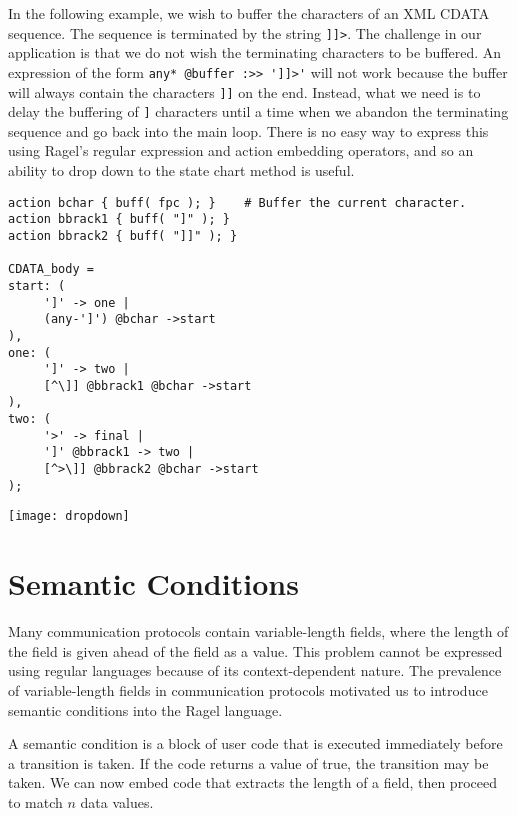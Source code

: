 \documentclass[letterpaper,11pt,oneside]{book}
\newcommand{\graphspace}{\vspace{10pt}}
\newenvironment{inline_code}{\def\baselinestretch{1}\vspace{12pt}\small}{}
\begin{document}
In the following example, we wish to buffer the characters of an XML CDATA
sequence. The sequence is terminated by the string \verb|]]>|. The challenge
in our application is that we do not wish the terminating characters to be
buffered. An expression of the form \verb|any* @buffer :>> ']]>'| will not work
because the buffer will always contain the characters \verb|]]| on the end.
Instead, what we need is to delay the buffering of \hspace{0.25mm} \verb|]|
characters until a time when we
abandon the terminating sequence and go back into the main loop. There is no
easy way to express this using Ragel's regular expression and action embedding
operators, and so an ability to drop down to the state chart method is useful.

\begin{inline_code}
\begin{verbatim}
action bchar { buff( fpc ); }    # Buffer the current character.
action bbrack1 { buff( "]" ); }
action bbrack2 { buff( "]]" ); }

CDATA_body =
start: (
     ']' -> one |
     (any-']') @bchar ->start
),
one: (
     ']' -> two |
     [^\]] @bbrack1 @bchar ->start
),
two: (
     '>' -> final |
     ']' @bbrack1 -> two |
     [^>\]] @bbrack2 @bchar ->start
);
\end{verbatim}
\end{inline_code}

\graphspace
\begin{center}
\texttt{[image: dropdown]}
\end{center}


\section{Semantic Conditions}
\label{semantic}

Many communication protocols contain variable-length fields, where the length
of the field is given ahead of the field as a value. This
problem cannot be expressed using regular languages because of its
context-dependent nature. The prevalence of variable-length fields in
communication protocols motivated us to introduce semantic conditions into
the Ragel language.

A semantic condition is a block of user code that is executed immediately
before a transition is taken. If the code returns a value of true, the
transition may be taken.  We can now embed code that extracts the length of a
field, then proceed to match $n$ data values.
\end{document}
